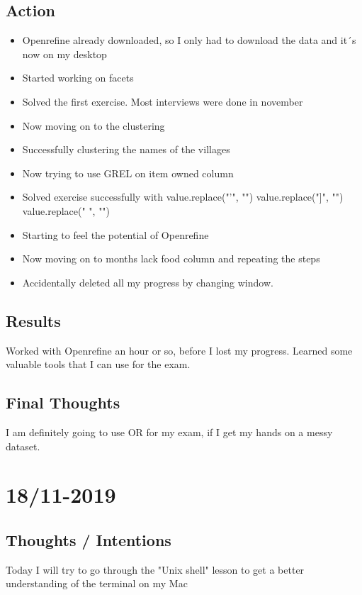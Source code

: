 \documentclass{article}
\begin{document}
\subsection{Action}
\begin{itemize}
    \item Openrefine already downloaded, so I only had to download the data and it´s now on my desktop
    \item Started working on facets 
    \item Solved the first exercise. Most interviews were done in november
    \item Now moving on to the clustering 
    \item Successfully clustering the names of the villages 
    \item Now trying to use GREL on item owned column
    \item Solved exercise successfully with 
          value.replace("'", "")
          value.replace("]", "")
          value.replace(" ", "")
    \item Starting to feel the potential of Openrefine 
    \item Now moving on to months lack food column and repeating the steps 
    \item Accidentally deleted all my progress by changing window. 
    \end{itemize}

\subsection{Results}
\text Worked with Openrefine an hour or so, before I lost my progress. Learned some valuable tools that I can use for the exam. 

\subsection{Final Thoughts}
\text I am definitely going to use OR for my exam, if I get my hands on a messy dataset.

\section{18/11-2019}
\subsection{Thoughts / Intentions}
\text Today I will try to go through the "Unix shell" lesson to get a better understanding of the terminal on my Mac 
\end{document}
